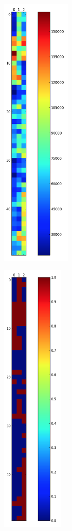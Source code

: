 \documentclass[a4paper, oneside]{csthesis}
\begin{document}
\begin{figure}
    \centering

    \begin{subfigure}[b]{0.3\textwidth}
            \centering
            \includegraphics[height=14cm]{figures/dtw_forgeries_1.png}
            \caption{}
            \label{fig:dtw-forgeries1}
    \end{subfigure}%
    \qquad
    \begin{subfigure}[b]{0.3\textwidth}
            \centering
            \includegraphics[height=14cm]{figures/dtw_forgeries_2.png}

\end{subfigure}
\end{figure}
\end{document}

